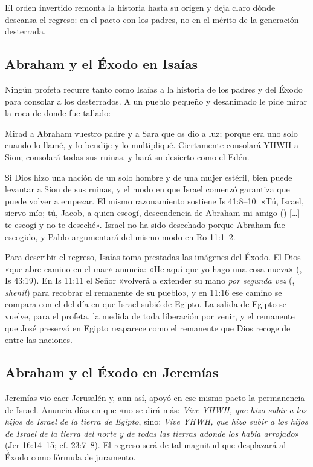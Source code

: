 El orden invertido remonta la historia hasta su origen y deja claro dónde descansa el regreso: en el pacto con los padres, no en el mérito de la generación desterrada.

\subsection{Abraham y el Éxodo en Isaías}
Ningún profeta recurre tanto como Isaías a la historia de los padres y del Éxodo para consolar a los desterrados. A un pueblo pequeño y desanimado le pide mirar la roca de donde fue tallado:

\begin{cita}Mirad a Abraham vuestro padre y a Sara que os dio a luz; porque era uno solo cuando lo llamé, y lo bendije y lo multipliqué. Ciertamente consolará YHWH a Sion; consolará todas sus ruinas, y hará su desierto como el Edén.\end{cita}

Si Dios hizo una nación de un solo hombre y de una mujer estéril, bien puede levantar a Sion de sus ruinas, y el modo en que Israel comenzó garantiza que puede volver a empezar. El mismo razonamiento sostiene Is 41:8–10: «Tú, Israel, siervo mío; tú, Jacob, a quien escogí, descendencia de Abraham mi amigo () [\ldots] te escogí y no te deseché». Israel no ha sido desechado porque Abraham fue escogido, y Pablo argumentará del mismo modo en Ro 11:1–2.

Para describir el regreso, Isaías toma prestadas las imágenes del Éxodo. El Dios «que abre camino en el mar» anuncia: «He aquí que yo hago una cosa nueva» (, Is 43:19). En Is 11:11 el Señor «volverá a extender su mano \emph{por segunda vez} (, \emph{shenit}) para recobrar el remanente de su pueblo», y en 11:16 ese camino se compara con el del día en que Israel subió de Egipto. La salida de Egipto se vuelve, para el profeta, la medida de toda liberación por venir, y el remanente que José preservó en Egipto reaparece como el remanente que Dios recoge de entre las naciones.

\subsection{Abraham y el Éxodo en Jeremías}
Jeremías vio caer Jerusalén y, aun así, apoyó en ese mismo pacto la permanencia de Israel. Anuncia días en que «no se dirá más: \emph{Vive YHWH, que hizo subir a los hijos de Israel de la tierra de Egipto}, sino: \emph{Vive YHWH, que hizo subir a los hijos de Israel de la tierra del norte y de todas las tierras adonde los había arrojado}» (Jer 16:14–15; cf. 23:7–8). El regreso será de tal magnitud que desplazará al Éxodo como fórmula de juramento.

